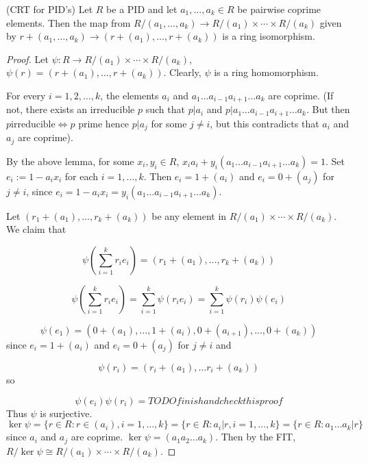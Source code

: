 \begin{theorem}
	(CRT for PID's) Let $R$ be a PID and let $a_1, \ldots, a_k \in R$ be pairwise coprime elements. Then the map from $R / (a_1, \ldots, a_k) \rightarrow R / (a_1) \times \cdots \times R / (a_k)$ given by $r + (a_1, \dots, a_k) \rightarrow (r + (a_1), \dots, r + (a_k))$ is a ring isomorphism.
\end{theorem}

\begin{proof}
	Let $\psi: R \rightarrow R / (a_1) \times \cdots \times R / (a_k)$, $\psi(r) = (r + (a_1), \dots, r + (a_k))$. Clearly, $\psi$ is a ring homomorphism. 
	
	For every $i = 1, 2, \dots, k$, the elements $a_i$ and $a_1 \dots a_{i - 1} a_{i + 1} \dots a_k$ are coprime. (If not, there exists an irreducible $p$ such that $p | a_i$ and $p | a_1 \dots a_{i - 1} a_{i + 1} \dots a_k$. But then $p \text{irreducible} \Leftrightarrow p \text{ prime}$ hence $p | a_j$ for some $j \ne i$, but this contradicts that $a_i$ and $a_j$ are coprime).

	By the above lemma, for some $x_i, y_i \in R$, $x_i a_i + y_i (a_1 \dots a_{i - 1} a_{i + 1} \dots a_k) = 1$. Set $e_i := 1 - a_i x_i$ for each $i = 1, \dots, k$. Then $e_i = 1 + (a_i)$ and $e_i = 0 + (a_j)$ for $j \ne i$, since $e_i = 1 - a_i x_i = y_i (a_1 \dots a_{i - 1} a_{i + 1} \dots a_k)$.

	Let $(r_1 + (a_1), \dots, r_k + (a_k))$ be any element in $R / (a_1) \times \cdots \times R / (a_k)$. We claim that

	\[ \psi \left( \sum_{i = 1}^k r_i e_i \right) = (r_1 + (a_1), \dots, r_k + (a_k)) \]

	\[ \psi \left( \sum_{i = 1}^k r_i e_i \right) = \sum_{i = 1}^k \psi(r_i e_i) = \sum_{i = 1}^k \psi(r_i) \psi(e_i) \]

	\[ \psi(e_1) = (0 + (a_1), \dots, 1 + (a_i), 0 + (a_{i + 1}), \dots, 0 + (a_k)) \]
	since $e_i = 1 + (a_i)$ and $e_i = 0 + (a_j)$ for $j \ne i$ and

	\[ \psi(r_i) = (r_i + (a_1), \dots r_i + (a_k)) \] so

	\[ \psi(e_i) \psi(r_i) = TODO finish and check this proof \]
	Thus $\psi$ is surjective.
	$\ker \psi = \{ r \in R: r \in (a_i), i = 1, \dots, k \} = \{ r \in R: a_i | r, i = 1, \dots, k \} = \{ r \in R: a_1 \dots a_k | r \}$ since $a_i$ and $a_j$ are coprime.
	$\ker \psi = (a_1 a_2 \dots a_k)$. Then by the FIT, $R / \ker \psi \cong R / (a_1) \times \cdots \times R / (a_k)$.
\end{proof}

